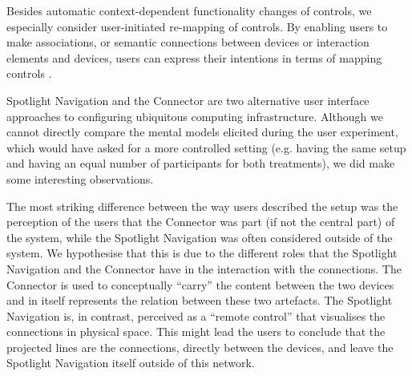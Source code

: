 Besides automatic context-dependent functionality changes of controls, we especially consider user-initiated re-mapping of controls. By enabling users to make associations, or semantic connections \cite{VanderVlist2010} between devices or interaction elements and devices, users can express their intentions in terms of mapping controls \cite{Niezen2010}. 

% 

Spotlight Navigation and the Connector are two alternative user interface approaches to configuring ubiquitous computing infrastructure. Although we cannot directly compare the mental models elicited during the user experiment, which would have asked for a more controlled setting (e.g. having the same setup and having an equal number of participants for both treatments), we did make some interesting observations.

The most striking difference between the way users described the setup was the perception of the users that the Connector was part (if not the central part) of the system, while the Spotlight Navigation was often considered outside of the system. We hypothesise that this is due to the different roles that the Spotlight Navigation and the Connector have in the interaction with the connections. The Connector is used to conceptually ``carry'' the content between the two devices and in itself represents the relation between these two artefacts. The Spotlight Navigation is, in contrast, perceived as a ``remote control'' that visualises the connections in physical space. This might lead the users to conclude that the projected lines are the connections, directly between the devices, and leave the Spotlight Navigation itself outside of this network.


